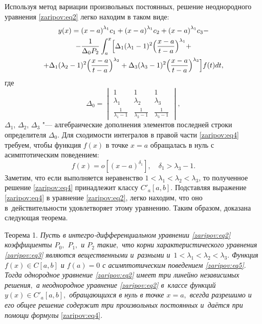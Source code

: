 Используя метод вариации произвольных постоянных, решение неоднородного уравнения \eqref{zaripov:eq2} легко находим в таком виде:
 \begin{multline}
y(x)={(x-a)}^{{\lambda}_{1}}c_1+{(x-a)}^{{\lambda}_{1}}c_2+{(x-a)}^{{\lambda}_{1}}c_3-\\
-\frac{1}{{\Delta_0}P_2}\int _{a}^{x}
\Bigl[\Delta_1 (\lambda_1-1)^2\Bigl(\frac{x-a}{t-a}\Bigr)^{\lambda_1}+\\
+{\Delta_1} (\lambda_2-1)^2\Bigl(\frac{x-a}{t-a}\Bigr)^{\lambda_2}+
{\Delta_3}{({{\lambda_3}-1})^2}
\Bigl(\frac{x-a}{t-a}\Bigr)^{\lambda_3}\Bigr]f(t) dt,\label{zaripov:eq4}
\end{multline}
где
$$ \Delta_0=
\begin{vmatrix}
1 & 1 & 1 \\ {\lambda_1} & {\lambda_2} & {\lambda_3} \\ \frac{1}{{\lambda_1}-1} & \frac{1}{{\lambda_2}-1} & \frac{1}{{\lambda_3}-1}
\end{vmatrix},
$$
$\Delta_1$, $\Delta_2$, $\Delta_3$ "--- алгебраические дополнения элементов последней строки определителя $\Delta_0.$
 Для сходимости интегралов в правой части \eqref{zaripov:eq4} требуем, чтобы функция $f(x)$ в точке $x=a$ обращалась в нуль с асимптотическим поведением:
 \begin{equation}
f(x)=o\left[\left(x-a\right)^{\delta_1}\right], \quad  
{\delta_1}>{{\lambda_3}-1}.
\label{zaripov:eq5}
\end{equation}
Заметим, что если выполняется неравенство $1<\lambda_1< \lambda_2< \lambda_3$, то полученное решение \eqref{zaripov:eq4} принадлежит классу $C'_a[a,b] $.
Подставляя выражение \eqref{zaripov:eq4} в уравнение \eqref{zaripov:eq2}, легко находим, что оно в~действительности удовлетворяет этому уравнению.
Таким образом, доказана следующая теорема.

\smallskip

{\small \sc Теорема 1.} 
{\it Пусть в интегро-дифференциальном уравнении \eqref{zaripov:eq2} коэффициенты $P_0,$ $P_1,$  и $P_2$    такие$,$ что корни характеристического уравнения \eqref{zaripov:eq3} являются вещественными и~разными и~$1<\lambda_1< \lambda_2< \lambda_3.$ 
Функция $f(x)\in C[a,b]$   и  $f(a)=0$ с асимптотическим поведением \eqref{zaripov:eq5}$.$ 
Тогда однородное уравнение \eqref{zaripov:eq2} имеет три линейно независимых решения$,$ а неоднородное уравнение \eqref{zaripov:eq2} в~классе функций $y(x)\in C'_a[a,b],$ обращающихся в нуль в точке $x=a,$ всегда разрешимо и его общее решение содержит три произвольных постоянных и~даётся при помощи формулы} \eqref{zaripov:eq4}.

